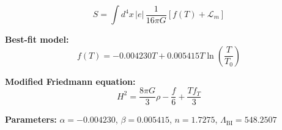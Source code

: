 
\begin{equation}
  S = \int d^4x \, |e| \, \frac{1}{16\pi G} \left[ f(T) + \mathcal{L}_m \right]
\end{equation}

\textbf{Best-fit model:}
\begin{equation}
  f(T) = -0.004230 T + 0.005415 T \ln\!\left(\frac{T}{T_0}\right)
\end{equation}

\textbf{Modified Friedmann equation:}
\begin{equation}
  H^2 = \frac{8\pi G}{3} \rho - \frac{f}{6} + \frac{T f_T}{3}
\end{equation}

\textbf{Parameters:}
$\alpha = -0.004230$, \quad
$\beta = 0.005415$, \quad
$n = 1.7275$, \quad
$\Lambda_{\text{BI}} = 548.2507$